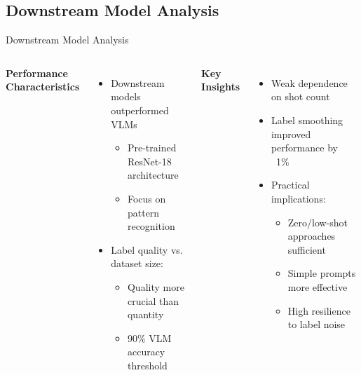 \documentclass[aspectratio=169]{beamer}
\begin{document}

\subsection{Downstream Model Analysis}
\begin{frame}{Downstream Model Analysis}
  \begin{columns}[T]
      \textbf{Performance Characteristics}
      \begin{itemize}
        \item Downstream models outperformed VLMs
        \begin{itemize}
          \item Pre-trained ResNet-18 architecture
          \item Focus on pattern recognition
        \end{itemize}
        \item Label quality vs. dataset size:
        \begin{itemize}
          \item Quality more crucial than quantity
          \item 90\% VLM accuracy threshold
        \end{itemize}
      \end{itemize}
      \textbf{Key Insights}
      \begin{itemize}
        \item Weak dependence on shot count
        \item Label smoothing improved performance by ~1\%
        \item Practical implications:
        \begin{itemize}
          \item Zero/low-shot approaches sufficient
          \item Simple prompts more effective
          \item High resilience to label noise
        \end{itemize}
      \end{itemize}
  \end{columns}
\end{frame}
\end{document}

